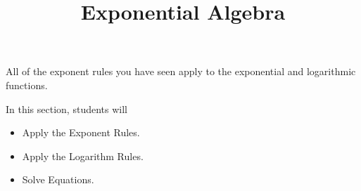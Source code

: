 \documentclass{ximera}
\title{Exponential Algebra}
\begin{document}
\begin{abstract}
\end{abstract}
\maketitle



All of the exponent rules you have seen apply to the exponential and logarithmic functions.
















\begin{sectionOutcomes}
In this section, students will 

\begin{itemize}
\item Apply the Exponent Rules.
\item Apply the Logarithm Rules.
\item Solve Equations.
\end{itemize}
\end{sectionOutcomes}
\end{document}
